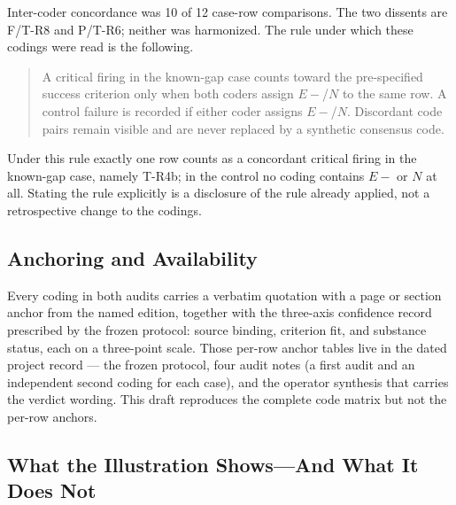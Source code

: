 \documentclass[11pt,a4paper]{article}
\begin{document}
\noindent
Inter-coder concordance was 10 of 12 case-row comparisons. The two dissents are
F/T-R8 and P/T-R6; neither was harmonized. The rule under which these codings
were read is the following.

\begin{quote}
A critical firing in the known-gap case counts toward the pre-specified success
criterion only when both coders assign $E{-}$/$N$ to the same row. A control
failure is recorded if either coder assigns $E{-}$/$N$. Discordant code pairs
remain visible and are never replaced by a synthetic consensus code.
\end{quote}

\noindent
Under this rule exactly one row counts as a concordant critical firing in the
known-gap case, namely T-R4b; in the control no coding contains $E{-}$ or $N$
at all. Stating the rule explicitly is a disclosure of the rule already
applied, not a retrospective change to the codings.

\subsection{Anchoring and Availability}\label{sec:anchors}

Every coding in both audits carries a verbatim quotation with a page or section
anchor from the named edition, together with the three-axis confidence record
prescribed by the frozen protocol: source binding, criterion fit, and substance
status, each on a three-point scale. Those per-row anchor tables live in the
dated project record --- the frozen protocol, four audit notes (a first audit
and an independent second coding for each case), and the operator synthesis
that carries the verdict wording. This draft reproduces the complete code
matrix but not the per-row anchors.

\subsection{\texorpdfstring{What the Illustration Shows---And What It Does Not}{What the Illustration Shows -- And What It Does Not}}
\end{document}
